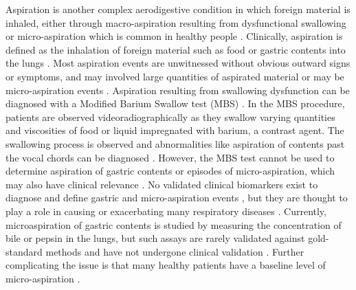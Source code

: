 \documentclass[12pt]{article}
\begin{document}
Aspiration is another complex aerodigestive condition in which foreign material is inhaled, either through macro-aspiration resulting from dysfunctional swallowing or micro-aspiration which is common in healthy people \cite{sweet-gerd_asp-2009, dickson-lung_microbiome-2014}.
Clinically, aspiration is defined as the inhalation of foreign material such as food or 
gastric contents into the lungs \cite{raghavendran-asp_injury-2011}. 
Most aspiration events are unwitnessed without obvious outward signs 
or symptoms, and may involved large quantities of aspirated material 
or may be micro-aspiration events \cite{raghavendran-asp_injury-2011}. 
Aspiration resulting from swallowing dysfunction can be diagnosed with 
a Modified Barium Swallow test (MBS) \cite{martinharris-mbs-2008}. In 
the MBS procedure, patients are observed videoradiographically as they 
swallow varying quantities and viscosities of food or liquid 
impregnated with barium, a contrast agent. The swallowing process is 
observed and abnormalities like aspiration of contents past the vocal 
chords can be diagnosed \cite{martinharris-mbs-2008, martinharris-clinical_mbs-2000}. 
However, the MBS test cannot be used to 
determine aspiration of gastric contents or episodes of micro-aspiration, which may also have clinical relevance 
\cite{raghavendran-asp_injury-2011, lee-pulm_asp-2014}. No validated clinical 
biomarkers exist to diagnose and define gastric and micro-aspiration 
events \cite{lee-pulm_asp-2014, debenedictis-asp_dis-2009}, but they are thought to play a role in 
causing or exacerbating many respiratory diseases 
\cite{houghton-microaspiration-2016, reen-aspirated_bile-2014, almomani-cf_sputum-2016}. Currently, microaspiration of gastric contents 
is studied by measuring the concentration of bile or pepsin in the 
lungs, but such assays are rarely validated against gold-standard 
methods and have not undergone clinical validation 
\cite{houghton-microaspiration-2016, lee-pulm_asp-2014}. Further complicating 
the issue is that many healthy patients have a baseline level of 
micro-aspiration \cite{dickson-lung_microbiome-2014, sweet-gerd_asp-2009, debenedictis-asp_dis-2009}.
\end{document}
